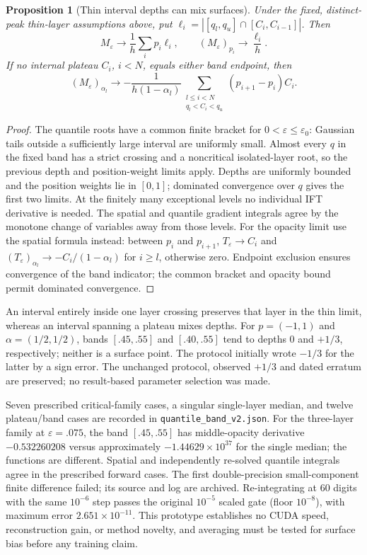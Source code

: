 \documentclass[11pt,a4paper]{article}
\newtheorem{proposition}[theorem]{Proposition}
\begin{document}
\begin{proposition}[Thin interval depths can mix surfaces]
Under the fixed, distinct-peak thin-layer assumptions above, put
$\ell_i=|[q_l,q_u]\cap[C_i,C_{i-1}]|$. Then
\[
 M_\varepsilon\longrightarrow\frac1h\sum_i p_i\ell_i,
 \qquad (M_\varepsilon)_{p_i}\longrightarrow\frac{\ell_i}{h}.
\]
If no internal plateau $C_i$, $i<N$, equals either band endpoint, then
\[
 (M_\varepsilon)_{\alpha_l}\longrightarrow
 -\frac1{h(1-\alpha_l)}
 \sum_{\substack{l\le i<N\\q_l<C_i<q_u}}
 (p_{i+1}-p_i)C_i.
\]
\end{proposition}
\begin{proof}
The quantile roots have a common finite bracket for
$0<\varepsilon\le\varepsilon_0$: Gaussian tails outside a sufficiently
large interval are uniformly small. Almost every $q$ in the fixed band
has a strict crossing and a noncritical isolated-layer root, so the
previous depth and position-weight limits apply. Depths are uniformly
bounded and the position weights lie in $[0,1]$; dominated convergence
over $q$ gives the first two limits. At the finitely many exceptional
levels no individual IFT derivative is needed. The spatial and quantile
gradient integrals agree by the monotone change of variables away from
those levels. For the opacity limit use the spatial formula instead:
between $p_i$ and $p_{i+1}$, $T_\varepsilon\to C_i$ and
$(T_\varepsilon)_{\alpha_l}\to-C_i/(1-\alpha_l)$ for $i\ge l$, otherwise
zero. Endpoint exclusion ensures convergence of the band indicator;
the common bracket and opacity bound permit dominated convergence.
\end{proof}

An interval entirely inside one layer crossing preserves that layer in
the thin limit, whereas an interval spanning a plateau mixes depths.
For $p=(-1,1)$ and $\alpha=(1/2,1/2)$, bands $[.45,.55]$ and
$[.40,.55]$ tend to depths $0$ and $+1/3$, respectively; neither is a
surface point. The protocol initially wrote $-1/3$ for the latter by
a sign error. The unchanged protocol, observed $+1/3$ and dated erratum
are preserved; no result-based parameter selection was made.

Seven prescribed critical-family cases, a singular single-layer median,
and twelve plateau/band cases are recorded in
\texttt{quantile\_band\_v2.json}. For the three-layer family at
$\varepsilon=.075$, the band $[.45,.55]$ has middle-opacity derivative
$-0.532260208$ versus approximately $-1.44629\times10^{37}$ for the
single median; the functions are different.
Spatial and independently re-solved quantile integrals agree in the
prescribed forward cases. The first double-precision small-component
finite difference failed; its source and log are archived.
Re-integrating at 60 digits with the same $10^{-6}$ step passes the
original $10^{-5}$ scaled gate (floor $10^{-8}$), with maximum error
$2.651\times10^{-11}$. This prototype establishes no CUDA speed,
reconstruction gain, or method novelty, and averaging must be tested
for surface bias before any training claim.
\end{document}
